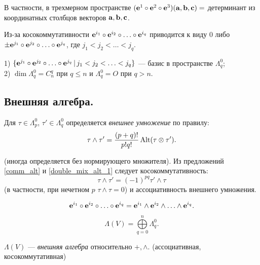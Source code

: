 В частности, в трехмерном пространстве 
$(\mathbf{e}^{1}\circ \mathbf{e}^{2}\circ \mathbf{e}^{3}) (\mathbf{a}, \mathbf{b}, \mathbf{c}) = $
детерминант из координатных столбцов векторов $\mathbf{a}, \mathbf{b}, \mathbf{c}$.


Из-за косокоммутативности $\mathbf{e}^{i_1} \circ \mathbf{e}^{i_2} \circ \ldots \circ \mathbf{e}^{i_q}$ 
приводится к виду $0$ либо $\pm \mathbf{e}^{j_1} \circ \mathbf{e}^{j_2} \circ \ldots \circ \mathbf{e}^{j_q} $, где
$j_1<j_2<\ldots <j_q$.


\begin{predl}
1) $\{\mathbf{e}^{j_1} \circ \mathbf{e}^{j_2} \circ \ldots \circ \mathbf{e}^{j_q} \, |\, 
j_1<j_2<\ldots <j_q\}$ ---
 базис в пространстве $\Lambda^0_q$;\\
2) $\dim \Lambda^0_q = C_{n}^q$ при $q\leq n$ и $\Lambda^0_q = O$ при $q>n$.
\end{predl}





\subsection{ 
Внешняя алгебра.}




Для $\tau \in \Lambda^0_p$, $\tau ' \in \Lambda^0_{q}$ определяется {\it внешнее умножение} по правилу: 
$$\tau \wedge \tau ' =  \dfrac{(p+q)!}{p!q!} \mathop{\rm Alt}\nolimits(\tau \otimes \tau '). $$

(иногда определяется без нормирующего множителя).
Из предложений \ref{comm_alt} и 
\ref{double_mix_alt_1} следует косокоммутативность:
$$\tau \wedge \tau ' = (-1)^{pq}\tau '\wedge \tau $$
(в частности, при нечетном $p$ $\tau \wedge \tau =0$) 
и ассоциативность внешнего умножения.

$$\mathbf{e}^{i_1}\circ \mathbf{e}^{i_2}\circ \ldots \circ \mathbf{e}^{i_q} = 
\mathbf{e}^{i_1}\wedge \mathbf{e}^{i_2}\wedge \ldots \wedge \mathbf{e}^{i_q}.$$


$$\Lambda(V ) = \bigoplus\limits_{q=0}^{n} \Lambda^0_q.$$

$\Lambda(V )$ --- {\it внешняя алгебра} относительно $+, \wedge$.
(ассоциативная, косокоммутативная)






